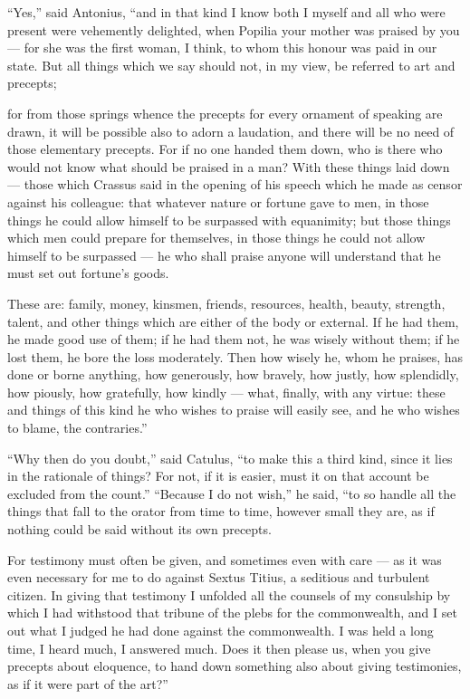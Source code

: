  ``Yes,'' said Antonius, ``and in that kind I know both I myself and all who were present were vehemently delighted, when Popilia your mother was praised by you — for she was the first woman, I think, to whom this honour was paid in our state. But all things which we say should not, in my view, be referred to art and precepts;

 for from those springs whence the precepts for every ornament of speaking are drawn, it will be possible also to adorn a laudation, and there will be no need of those elementary precepts. For if no one handed them down, who is there who would not know what should be praised in a man? With these things laid down — those which Crassus said in the opening of his speech which he made as censor against his colleague: that whatever nature or fortune gave to men, in those things he could allow himself to be surpassed with equanimity; but those things which men could prepare for themselves, in those things he could not allow himself to be surpassed — he who shall praise anyone will understand that he must set out fortune's goods.

 These are: family, money, kinsmen, friends, resources, health, beauty, strength, talent, and other things which are either of the body or external. If he had them, he made good use of them; if he had them not, he was wisely without them; if he lost them, he bore the loss moderately. Then how wisely he, whom he praises, has done or borne anything, how generously, how bravely, how justly, how splendidly, how piously, how gratefully, how kindly — what, finally, with any virtue: these and things of this kind he who wishes to praise will easily see, and he who wishes to blame, the contraries.''

 ``Why then do you doubt,'' said Catulus, ``to make this a third kind, since it lies in the rationale of things? For not, if it is easier, must it on that account be excluded from the count.'' ``Because I do not wish,'' he said, ``to so handle all the things that fall to the orator from time to time, however small they are, as if nothing could be said without its own precepts.

 For testimony must often be given, and sometimes even with care — as it was even necessary for me to do against Sextus Titius, a seditious and turbulent citizen. In giving that testimony I unfolded all the counsels of my consulship by which I had withstood that tribune of the plebs for the commonwealth, and I set out what I judged he had done against the commonwealth. I was held a long time, I heard much, I answered much. Does it then please us, when you give precepts about eloquence, to hand down something also about giving testimonies, as if it were part of the art?''

